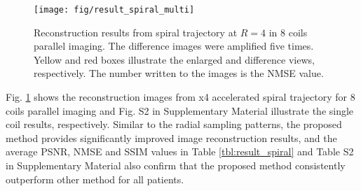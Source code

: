 \documentclass[10pt,journal]{IEEEtran}
\newcommand{\0}{{\boldsymbol{0}}}
\begin{document}
\begin{figure}[!t] 	
\centerline{\texttt{[image: fig/result\_spiral\_multi]}}
\caption{Reconstruction results from spiral trajectory at $R=4$ in 8 coils parallel imaging. The difference images were amplified five times. Yellow and red boxes illustrate the enlarged and difference views, respectively. The number written to the images is the NMSE value.}
\label{fig:result_spiral}
\end{figure}


\begin{table}[!t]
\centerline{
}
\vspace*{0.1cm}
\caption{Quantitative comparison from radial undersampling at $R=6$ in 8 coils parallel imaging. }



\label{tbl:result_radial}
\end{table}



 Fig. \ref{fig:result_spiral} shows the reconstruction images from x4 accelerated  spiral trajectory for 8 coils parallel imaging and Fig. S2 in Supplementary Material illustrate the single coil results, respectively.
Similar to the radial sampling patterns, the proposed method provides significantly improved image reconstruction results, and the average PSNR, NMSE and SSIM values in Table \ref{tbl:result_spiral} and Table S2 in Supplementary Material also confirm that the proposed method consistently outperform other method for all patients. 
\end{document}
